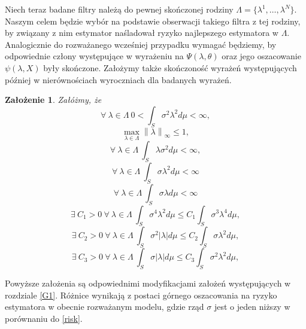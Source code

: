 \documentclass[man,mfiu]{mgrwms}
\newcommand{\norm}[1]{\left\lVert#1\right\rVert}
\newtheorem{za}{Założenie}[chapter]
\begin{document}
Niech teraz badane filtry należą do pewnej skończonej rodziny $\Lambda=\{\lambda^1,\dots ,\lambda^N\}$. Naszym celem będzie wybór na podstawie obserwacji takiego filtra z tej rodziny, by związany z nim estymator naśladował ryzyko najlepszego estymatora w $\Lambda$.\\
Analogicznie do rozważanego wcześniej przypadku wymagać będziemy, by odpowiednie człony występujące w wyrażeniu na $\Psi(\lambda,\theta)$  oraz jego oszacowanie $\psi(\lambda, X)$ były skończone. Założymy także skończoność wyrażeń występujących później w nierównościach wyroczniach dla badanych wyrażeń.
\begin{za}\label{assbig}
Załóżmy, że
\begin{displaymath}
\forall\ \lambda \in \Lambda\ 0<\int_S\sigma^2\lambda^2d\mu <\infty,
\end{displaymath}
\begin{displaymath}
\max_{\lambda \in \Lambda}\norm{\lambda}_{\infty}\leq 1,
\end{displaymath}
\begin{displaymath}
\forall\ \lambda \in \Lambda\ \int_S\lambda\sigma^2d\mu <\infty,
\end{displaymath}
\begin{displaymath}
\forall\ \lambda \in \Lambda\ \int_S\sigma\lambda^2d\mu<\infty
\end{displaymath}
\begin{displaymath}
\forall\ \lambda \in \Lambda\ \int_S\sigma\lambda d\mu<\infty
\end{displaymath}
\begin{displaymath}
\exists\ C_1>0\ \forall\ \lambda \in \Lambda\ \int_S \sigma^4\lambda^2 d\mu \leq C_1\int_S\sigma^3\lambda^4d\mu,
\end{displaymath}
\begin{displaymath}
\exists\ C_2>0\ \forall\ \lambda \in \Lambda\ \int_S \sigma^2|\lambda| d\mu \leq C_2\int_S\sigma\lambda^2d\mu,
\end{displaymath}
\begin{displaymath}
\exists\ C_3>0\ \forall\ \lambda \in \Lambda\ \int_S \sigma|\lambda| d\mu \leq C_3\int_S\sigma^2\lambda^2d\mu,
\end{displaymath}
\end{za}
Powyższe założenia są odpowiednimi modyfikacjami założeń występujących w rozdziale \ref{G1}. Różnice wynikają z postaci górnego oszacowania na ryzyko estymatora w obecnie rozważanym modelu, gdzie rząd $\sigma$ jest o jeden niższy w porównaniu do \ref{risk}.\\
\end{document}

